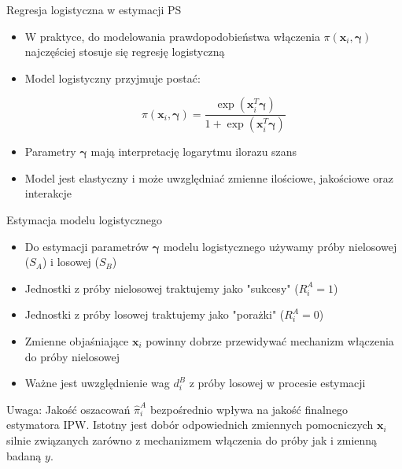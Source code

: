 \documentclass[10pt,ignorenonframetext, aspectratio=169]{beamer}
\newcommand{\bx}{\boldsymbol{x}}
\newcommand{\bgamma}{\boldsymbol{\gamma}}
\begin{document}
\begin{frame}{Regresja logistyczna w estymacji PS}
    \begin{itemize}
    \justifying
        \item W praktyce, do modelowania prawdopodobieństwa włączenia $\pi(\bx_i, \bgamma)$ najczęściej stosuje się regresję logistyczną
        \item Model logistyczny przyjmuje postać:
        
        \begin{equation}
        \pi(\bx_i, \bgamma) = \frac{\exp(\bx_i^T \bgamma)}{1 + \exp(\bx_i^T \bgamma)}
        \end{equation}
        
        \item Parametry $\bgamma$ mają interpretację logarytmu ilorazu szans
        \item Model jest elastyczny i może uwzględniać zmienne ilościowe, jakościowe oraz interakcje
    \end{itemize}
\end{frame}

\begin{frame}{Estymacja modelu logistycznego}
    \begin{itemize}
    \justifying
        \item Do estymacji parametrów $\bgamma$ modelu logistycznego używamy próby nielosowej ($S_A$) i losowej ($S_B$)
        \item Jednostki z próby nielosowej traktujemy jako "sukcesy"\; ($R_i^A = 1$)
        \item Jednostki z próby losowej traktujemy jako "porażki"\; ($R_i^A = 0$)
        \item Zmienne objaśniające $\bx_i$ powinny dobrze przewidywać mechanizm włączenia do próby nielosowej
        \item Ważne jest uwzględnienie wag $d_i^B$ z próby losowej w procesie estymacji
    \end{itemize}
    
    \vspace{0.5em}
    
    \alert{Uwaga:} Jakość oszacowań $\hat{\pi}_i^A$ bezpośrednio wpływa na jakość finalnego estymatora IPW. Istotny jest dobór odpowiednich zmiennych pomocniczych $\bx_i$ silnie związanych zarówno z mechanizmem włączenia do próby jak i zmienną badaną $y$.
\end{frame}
\end{document}

